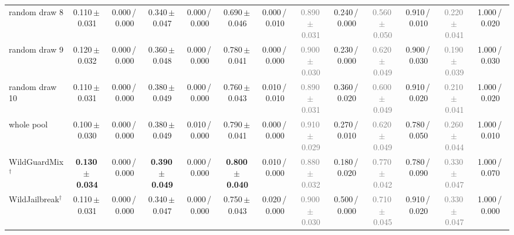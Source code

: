 \begin{tabular}{@{}lcccccccccccc@{}}
random draw 8 & 0.110\,{\scriptsize$\pm$\,0.031} & {\scriptsize 0.000\,/\,0.000} & 0.340\,{\scriptsize$\pm$\,0.047} & {\scriptsize 0.000\,/\,0.000} & 0.690\,{\scriptsize$\pm$\,0.046} & {\scriptsize 0.000\,/\,0.010} & \textcolor{gray}{0.890\,{\scriptsize$\pm$\,0.031}} & {\scriptsize 0.240\,/\,0.000} & \textcolor{gray}{0.560\,{\scriptsize$\pm$\,0.050}} & {\scriptsize 0.910\,/\,0.010} & \textcolor{gray}{0.220\,{\scriptsize$\pm$\,0.041}} & {\scriptsize 1.000\,/\,0.020} \\
random draw 9 & 0.120\,{\scriptsize$\pm$\,0.032} & {\scriptsize 0.000\,/\,0.000} & 0.360\,{\scriptsize$\pm$\,0.048} & {\scriptsize 0.000\,/\,0.000} & 0.780\,{\scriptsize$\pm$\,0.041} & {\scriptsize 0.000\,/\,0.000} & \textcolor{gray}{0.900\,{\scriptsize$\pm$\,0.030}} & {\scriptsize 0.230\,/\,0.000} & \textcolor{gray}{0.620\,{\scriptsize$\pm$\,0.049}} & {\scriptsize 0.900\,/\,0.030} & \textcolor{gray}{0.190\,{\scriptsize$\pm$\,0.039}} & {\scriptsize 1.000\,/\,0.030} \\
random draw 10 & 0.110\,{\scriptsize$\pm$\,0.031} & {\scriptsize 0.000\,/\,0.000} & 0.380\,{\scriptsize$\pm$\,0.049} & {\scriptsize 0.000\,/\,0.000} & 0.760\,{\scriptsize$\pm$\,0.043} & {\scriptsize 0.010\,/\,0.010} & \textcolor{gray}{0.890\,{\scriptsize$\pm$\,0.031}} & {\scriptsize 0.360\,/\,0.020} & \textcolor{gray}{0.600\,{\scriptsize$\pm$\,0.049}} & {\scriptsize 0.910\,/\,0.020} & \textcolor{gray}{0.210\,{\scriptsize$\pm$\,0.041}} & {\scriptsize 1.000\,/\,0.020} \\
whole pool & 0.100\,{\scriptsize$\pm$\,0.030} & {\scriptsize 0.000\,/\,0.000} & 0.380\,{\scriptsize$\pm$\,0.049} & {\scriptsize 0.010\,/\,0.000} & 0.790\,{\scriptsize$\pm$\,0.041} & {\scriptsize 0.000\,/\,0.000} & \textcolor{gray}{0.910\,{\scriptsize$\pm$\,0.029}} & {\scriptsize 0.270\,/\,0.010} & \textcolor{gray}{0.620\,{\scriptsize$\pm$\,0.049}} & {\scriptsize 0.780\,/\,0.050} & \textcolor{gray}{0.260\,{\scriptsize$\pm$\,0.044}} & {\scriptsize 1.000\,/\,0.010} \\
WildGuardMix$^\dagger$ & \textbf{0.130\,{\scriptsize$\pm$\,0.034}} & {\scriptsize 0.000\,/\,0.000} & \textbf{0.390\,{\scriptsize$\pm$\,0.049}} & {\scriptsize 0.000\,/\,0.000} & \textbf{0.800\,{\scriptsize$\pm$\,0.040}} & {\scriptsize 0.010\,/\,0.000} & \textcolor{gray}{0.880\,{\scriptsize$\pm$\,0.032}} & {\scriptsize 0.180\,/\,0.020} & \textcolor{gray}{0.770\,{\scriptsize$\pm$\,0.042}} & {\scriptsize 0.780\,/\,0.090} & \textcolor{gray}{0.330\,{\scriptsize$\pm$\,0.047}} & {\scriptsize 1.000\,/\,0.070} \\
WildJailbreak$^\dagger$ & 0.110\,{\scriptsize$\pm$\,0.031} & {\scriptsize 0.000\,/\,0.000} & 0.340\,{\scriptsize$\pm$\,0.047} & {\scriptsize 0.000\,/\,0.000} & 0.750\,{\scriptsize$\pm$\,0.043} & {\scriptsize 0.020\,/\,0.000} & \textcolor{gray}{0.900\,{\scriptsize$\pm$\,0.030}} & {\scriptsize 0.500\,/\,0.000} & \textcolor{gray}{0.710\,{\scriptsize$\pm$\,0.045}} & {\scriptsize 0.910\,/\,0.020} & \textcolor{gray}{0.330\,{\scriptsize$\pm$\,0.047}} & {\scriptsize 1.000\,/\,0.000} \\

\end{tabular}
